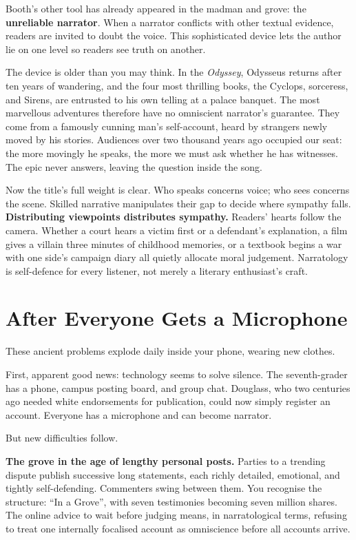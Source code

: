 Booth's other tool has already appeared in the madman and grove: the \textbf{unreliable narrator}. When a narrator conflicts with other textual evidence, readers are invited to doubt the voice. This sophisticated device lets the author lie on one level so readers see truth on another.

The device is older than you may think. In the \emph{Odyssey}, Odysseus returns after ten years of wandering, and the four most thrilling books, the Cyclops, sorceress, and Sirens, are entrusted to his own telling at a palace banquet. The most marvellous adventures therefore have no omniscient narrator's guarantee. They come from a famously cunning man's self-account, heard by strangers newly moved by his stories. Audiences over two thousand years ago occupied our seat: the more movingly he speaks, the more we must ask whether he has witnesses. The epic never answers, leaving the question inside the song.

Now the title's full weight is clear. Who speaks concerns voice; who sees concerns the scene. Skilled narrative manipulates their gap to decide where sympathy falls. \textbf{Distributing viewpoints distributes sympathy.} Readers' hearts follow the camera. Whether a court hears a victim first or a defendant's explanation, a film gives a villain three minutes of childhood memories, or a textbook begins a war with one side's campaign diary all quietly allocate moral judgement. Narratology is self-defence for every listener, not merely a literary enthusiast's craft.

\section{After Everyone Gets a Microphone}
These ancient problems explode daily inside your phone, wearing new clothes.

First, apparent good news: technology seems to solve silence. The seventh-grader has a phone, campus posting board, and group chat. Douglass, who two centuries ago needed white endorsements for publication, could now simply register an account. Everyone has a microphone and can become narrator.

But new difficulties follow.

\textbf{The grove in the age of lengthy personal posts.} Parties to a trending dispute publish successive long statements, each richly detailed, emotional, and tightly self-defending. Commenters swing between them. You recognise the structure: ``In a Grove'', with seven testimonies becoming seven million shares. The online advice to wait before judging means, in narratological terms, refusing to treat one internally focalised account as omniscience before all accounts arrive.

